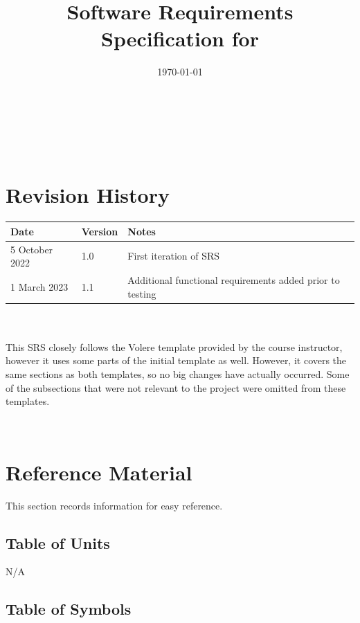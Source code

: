 \documentclass[12pt]{article}
\begin{document}
\title{Software Requirements Specification for \progname} 
\author{\authname}
\date{\today}
	
\maketitle

~\newpage


\tableofcontents

~\newpage

\section*{Revision History}

\begin{tabularx}{\textwidth}{p{3cm}p{2cm}X}
\toprule {\bf Date} & {\bf Version} & {\bf Notes}\\
\midrule
5 October 2022 & 1.0 & First iteration of SRS\\
1 March 2023 & 1.1 & Additional functional requirements added prior to testing\\
\bottomrule
\end{tabularx}
\\\\
This SRS closely follows the Volere template provided by the course instructor, however it uses some parts of the initial template as well. However, it covers the same sections as both templates, so no big changes have actually occurred. Some of the subsections that were not relevant to the project were omitted from these templates.

~\newpage

\section{Reference Material}

This section records information for easy reference.

\subsection{Table of Units}

N/A

\subsection{Table of Symbols}
\end{document}
